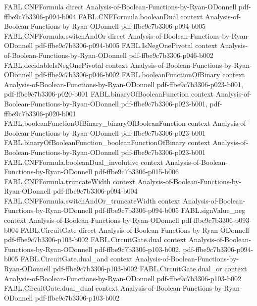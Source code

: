 \begin{theorem}
\proofstep
  {FABL.CNFFormula}
  {direct}
  {Analysis-of-Boolean-Functions-by-Ryan-ODonnell}
  {pdf-ffbe9c7b3306-p094-b004}
\proofstep
  {FABL.CNFFormula.booleanDual}
  {context}
  {Analysis-of-Boolean-Functions-by-Ryan-ODonnell}
  {pdf-ffbe9c7b3306-p094-b005}
\proofstep
  {FABL.CNFFormula.switchAndOr}
  {direct}
  {Analysis-of-Boolean-Functions-by-Ryan-ODonnell}
  {pdf-ffbe9c7b3306-p094-b005}
\proofstep
  {FABL.IsNegOnePivotal}
  {context}
  {Analysis-of-Boolean-Functions-by-Ryan-ODonnell}
  {pdf-ffbe9c7b3306-p046-b002}
\proofstep
  {FABL.decidableIsNegOnePivotal}
  {context}
  {Analysis-of-Boolean-Functions-by-Ryan-ODonnell}
  {pdf-ffbe9c7b3306-p046-b002}
\proofstep
  {FABL.booleanFunctionOfBinary}
  {context}
  {Analysis-of-Boolean-Functions-by-Ryan-ODonnell}
  {pdf-ffbe9c7b3306-p023-b001,
    pdf-ffbe9c7b3306-p020-b001}
\proofstep
  {FABL.binaryOfBooleanFunction}
  {context}
  {Analysis-of-Boolean-Functions-by-Ryan-ODonnell}
  {pdf-ffbe9c7b3306-p023-b001,
    pdf-ffbe9c7b3306-p020-b001}
\proofstep
  {FABL.booleanFunctionOfBinary_binaryOfBooleanFunction}
  {context}
  {Analysis-of-Boolean-Functions-by-Ryan-ODonnell}
  {pdf-ffbe9c7b3306-p023-b001}
\proofstep
  {FABL.binaryOfBooleanFunction_booleanFunctionOfBinary}
  {context}
  {Analysis-of-Boolean-Functions-by-Ryan-ODonnell}
  {pdf-ffbe9c7b3306-p023-b001}
\proofstep
  {FABL.CNFFormula.booleanDual_involutive}
  {context}
  {Analysis-of-Boolean-Functions-by-Ryan-ODonnell}
  {pdf-ffbe9c7b3306-p015-b006}
\proofstep
  {FABL.CNFFormula.truncateWidth}
  {context}
  {Analysis-of-Boolean-Functions-by-Ryan-ODonnell}
  {pdf-ffbe9c7b3306-p094-b004}
\proofstep
  {FABL.CNFFormula.switchAndOr_truncateWidth}
  {context}
  {Analysis-of-Boolean-Functions-by-Ryan-ODonnell}
  {pdf-ffbe9c7b3306-p094-b005}
\proofstep
  {FABL.signValue_neg}
  {context}
  {Analysis-of-Boolean-Functions-by-Ryan-ODonnell}
  {pdf-ffbe9c7b3306-p093-b004}
\proofstep
  {FABL.CircuitGate}
  {direct}
  {Analysis-of-Boolean-Functions-by-Ryan-ODonnell}
  {pdf-ffbe9c7b3306-p103-b002}
\proofstep
  {FABL.CircuitGate.dual}
  {context}
  {Analysis-of-Boolean-Functions-by-Ryan-ODonnell}
  {pdf-ffbe9c7b3306-p103-b002,
    pdf-ffbe9c7b3306-p094-b005}
\proofstep
  {FABL.CircuitGate.dual_and}
  {context}
  {Analysis-of-Boolean-Functions-by-Ryan-ODonnell}
  {pdf-ffbe9c7b3306-p103-b002}
\proofstep
  {FABL.CircuitGate.dual_or}
  {context}
  {Analysis-of-Boolean-Functions-by-Ryan-ODonnell}
  {pdf-ffbe9c7b3306-p103-b002}
\proofstep
  {FABL.CircuitGate.dual_dual}
  {context}
  {Analysis-of-Boolean-Functions-by-Ryan-ODonnell}
  {pdf-ffbe9c7b3306-p103-b002}
\proofstep

\end{theorem}
